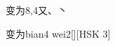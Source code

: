 \begin{entry}{变为}{8,4}{⼜、⼂}
  \begin{phonetics}{变为}{bian4 wei2}[][HSK 3]
  \end{phonetics}
\end{entry}
